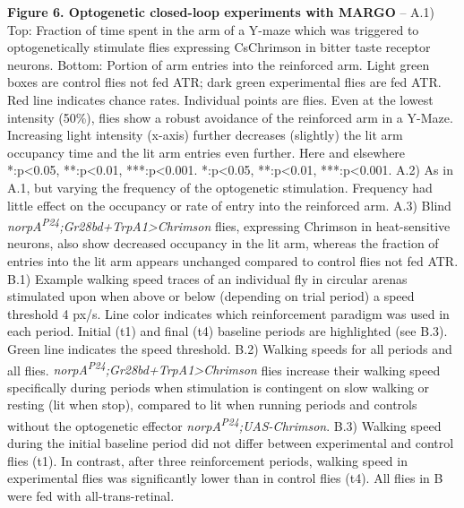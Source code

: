 \documentclass[10pt,letterpaper]{article}
\begin{document}
\clearpage
\textbf{Figure 6. Optogenetic closed-loop experiments with MARGO} -- A.1) Top: Fraction of time spent in the arm of a Y-maze which was triggered to optogenetically stimulate flies expressing CsChrimson in bitter taste receptor neurons. Bottom: Portion of arm entries into the reinforced arm. Light green boxes are control flies not fed ATR; dark green experimental flies are fed ATR. Red line indicates chance rates. Individual points are flies. Even at the lowest intensity (50\%), flies show a robust avoidance of the reinforced arm in a Y-Maze. Increasing light intensity (x-axis) further decreases (slightly) the lit arm occupancy time and the lit arm entries even further. Here and elsewhere *:p<0.05, **:p<0.01, ***:p<0.001. *:p<0.05, **:p<0.01, ***:p<0.001. 
A.2) As in A.1, but varying the frequency of the optogenetic stimulation. Frequency had little effect on the occupancy or rate of entry into the reinforced arm. 
A.3) Blind \textit{norpA\textsuperscript{P24};Gr28bd+TrpA1>Chrimson} flies, expressing Chrimson in heat-sensitive neurons, also show decreased occupancy in the lit arm, whereas the fraction of entries into the lit arm appears unchanged compared to control flies not fed ATR. 
B.1) Example walking speed traces of an individual fly in circular arenas stimulated upon when above or below (depending on trial period) a speed threshold 4 px/s. Line color indicates which reinforcement paradigm was used in each period. Initial (t1) and final (t4) baseline periods are highlighted (see B.3). Green line indicates the speed threshold.
B.2) Walking speeds for all periods and all flies. \textit{norpA\textsuperscript{P24};Gr28bd+TrpA1>Chrimson} flies increase their walking speed specifically during periods when stimulation is contingent on slow walking or resting (lit when stop), compared to lit when running periods and controls without the optogenetic effector \textit{norpA\textsuperscript{P24};UAS-Chrimson}.
B.3) Walking speed during the initial baseline period did not differ between experimental and control flies (t1). In contrast, after three reinforcement periods, walking speed in experimental flies was significantly lower than in control flies (t4). 
All flies in B were fed with all-trans-retinal.
\end{document}
